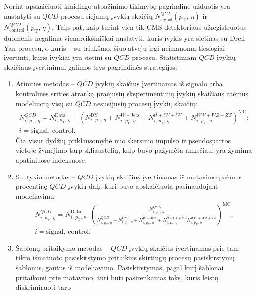 \documentclass[a4paper, 12pt, oneside]{article}
\newcommand{\pT}{p_{\mathrm{T}}}
\newcommand{\tbarW}{\bar{t}W}
\newcommand{\ttbar}{t\bar{t}}
\newcommand{\QCD}{QC\! D}
\begin{document}
Norint apskaičiuoti klaidingo atpažinimo tikimybę pagrindinė užduotis yra nustatyti su $\QCD$ procesu siejamų įvykių skaičių
$N^{\QCD}_{\mathrm{signal}}(\pT, \, \eta)$ ir $N^{\QCD}_{\mathrm{control}}(\pT, \, \eta)$.
Taip pat, kaip turint vien tik CMS detektoriaus užregistruotus duomenis negalima vienareikšmiškai nustatyti, kuris įvykis yra
sietinas su Drell-Yan procesu, o kuris -- su triukšmo, šiuo atveju irgi neįmanoma tiesiogiai įvertinti, kurie įvykiai yra
sietini su $\QCD$ procesu.
Statistiniam $\QCD$ įvykių skaičiaus įvertinimui galimos trys pagrindinės strategijos:
\begin{enumerate}
	\item Atimties metodas -- $\QCD$ įvykių skaičius įvertinamas iš signalo arba kontrolinės srities atranką praėjusių eksperimentinių
	įvykių skaičiaus atėmus modeliuotą visų su $\QCD$ nesusijusių procesų įvykių skaičių:
	\begin{multline}
		N^{\QCD}_{i, \, \pT, \, \eta} = N^{\mathrm{Data}}_{i, \, \pT, \, \eta} - \left( N^{\mathrm{DY}}_{i, \, \pT, \, \eta} +
		N^{W+\mathrm{Jets}}_{i, \, \pT, \, \eta} +  N^{\ttbar+tW+\tbarW}_{i, \, \pT, \, \eta} +
		N^{WW+WZ+ZZ}_{i, \, \pT, \, \eta} \right)^{\mathrm{MC}}; \\ i = \mathrm{signal}, \, \mathrm{control}.
	\end{multline}
	Čia visur dydžių priklausomybė nuo skersinio impulso ir pseudospartos vietoje žymėjimo tarp skliaustelių, kaip buvo pažymėta anksčiau,
	yra žymima apatiniuose indeksuose.
	\item Santykio metodas -- $\QCD$ įvykių skaičius įvertinamas iš matavimo paėmus procentinę $QCD$ įvykių dalį, kuri buvo apskaičiuota
	pasinaudojant modeliavimu:
	\begin{multline}
		N^{\QCD}_{i, \, \pT, \, \eta} = N^{\mathrm{Data}}_{i, \, \pT, \, \eta} \cdot \left(\frac{N^{\QCD}_{i, \, \pT, \, \eta}}
		{N^{\QCD}_{i, \, \pT, \, \eta} + N^{\mathrm{DY}}_{i, \, \pT, \, \eta} + N^{W+\mathrm{Jets}}_{i, \, \pT, \, \eta} +
		N^{\ttbar+tW+\tbarW}_{i, \, \pT, \, \eta} N^{WW+WZ+ZZ}_{i, \, \pT, \, \eta}} \right)^{\mathrm{MC}}; \\ i = \mathrm{signal}, \, \mathrm{control}.
	\end{multline}
	\item Šablonų pritaikymo metodas -- $\QCD$ įvykių skaičius įvertinamas prie tam tikro išmatuoto pasiskirstymo pritaikius
	skirtingų procesų pasiskirstymų šablonus, gautus iš modeliavimo.
	Pasiskirstymas, pagal kurį šablonai pritaikomi prie matavimo, turi būti pasirenkamas toks, kuris leistų diskriminuoti tarp

\end{enumerate}
\end{document}
